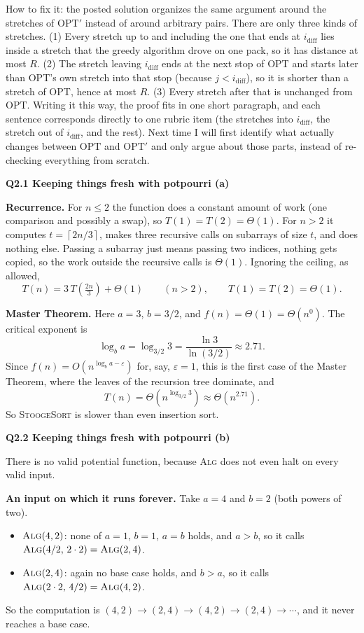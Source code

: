 \documentclass[11pt]{article}
\newcommand{\ceil}[1]{\left\lceil #1 \right\rceil}
\newcommand{\algo}[1]{\textsc{#1}}
\newcommand{\OPT}{\mathrm{OPT}}
\newcommand{\qpage}[1]{\clearpage\noindent\textbf{\large #1}\par\medskip}
\begin{document}
How to fix it: the posted solution organizes the same argument around the stretches of $\OPT'$ instead of around arbitrary pairs.
There are only three kinds of stretches.
(1) Every stretch up to and including the one that ends at $i_{\text{diff}}$ lies inside a stretch that the greedy algorithm drove on one pack, so it has distance at most $R$.
(2) The stretch leaving $i_{\text{diff}}$ ends at the next stop of $\OPT$ and starts later than $\OPT$'s own stretch into that stop (because $j < i_{\text{diff}}$), so it is shorter than a stretch of $\OPT$, hence at most $R$.
(3) Every stretch after that is unchanged from $\OPT$.
Writing it this way, the proof fits in one short paragraph, and each sentence corresponds directly to one rubric item (the stretches into $i_{\text{diff}}$, the stretch out of $i_{\text{diff}}$, and the rest).
Next time I will first identify what actually changes between $\OPT$ and $\OPT'$ and only argue about those parts, instead of re-checking everything from scratch.

\qpage{Q2.1 Keeping things fresh with potpourri (a)}

\textbf{Recurrence.}
For $n \le 2$ the function does a constant amount of work (one comparison and possibly a swap), so $T(1) = T(2) = \Theta(1)$.
For $n > 2$ it computes $t = \ceil{2n/3}$, makes three recursive calls on subarrays of size $t$, and does nothing else.
Passing a subarray just means passing two indices, nothing gets copied, so the work outside the recursive calls is $\Theta(1)$.
Ignoring the ceiling, as allowed,
\[
  T(n) = 3\,T\!\left(\tfrac{2n}{3}\right) + \Theta(1) \qquad (n > 2), \qquad T(1) = T(2) = \Theta(1).
\]

\textbf{Master Theorem.}
Here $a = 3$, $b = 3/2$, and $f(n) = \Theta(1) = \Theta(n^0)$.
The critical exponent is
\[
  \log_b a = \log_{3/2} 3 = \frac{\ln 3}{\ln (3/2)} \approx 2.71 .
\]
Since $f(n) = O(n^{\log_b a - \varepsilon})$ for, say, $\varepsilon = 1$, this is the first case of the Master Theorem, where the leaves of the recursion tree dominate, and
\[
  T(n) = \Theta\!\left(n^{\log_{3/2} 3}\right) \approx \Theta(n^{2.71}).
\]
So \algo{StoogeSort} is slower than even insertion sort.

\qpage{Q2.2 Keeping things fresh with potpourri (b)}

There is no valid potential function, because \algo{Alg} does not even halt on every valid input.

\textbf{An input on which it runs forever.}
Take $a = 4$ and $b = 2$ (both powers of two).
\begin{itemize}
  \item $\algo{Alg}(4,2)$: none of $a=1$, $b=1$, $a=b$ holds, and $a > b$, so it calls $\algo{Alg}(4/2,\, 2\cdot 2) = \algo{Alg}(2,4)$.
  \item $\algo{Alg}(2,4)$: again no base case holds, and $b > a$, so it calls $\algo{Alg}(2\cdot 2,\, 4/2) = \algo{Alg}(4,2)$.
\end{itemize}
So the computation is $(4,2) \to (2,4) \to (4,2) \to (2,4) \to \cdots$, and it never reaches a base case.
\end{document}
